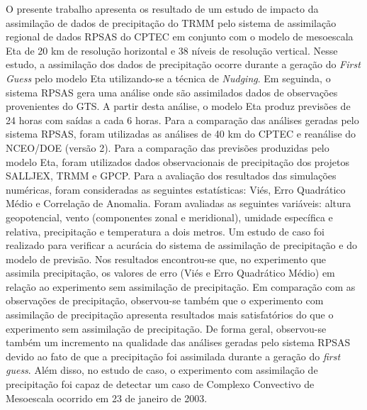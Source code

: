 \begin{resumo}
\hypertarget{estilo:abstract}{}

O presente trabalho apresenta os resultado de um estudo de impacto da assimilação de dados de precipitação do TRMM pelo sistema de assimilação regional de dados RPSAS do CPTEC em conjunto com o modelo de mesoescala Eta de 20 km de resolução horizontal e 38 níveis de resolução vertical. Nesse estudo, a assimilação dos dados de precipitação ocorre durante a geração do \textit{First Guess} pelo modelo Eta utilizando-se a técnica de \textit{Nudging}. Em seguinda, o sistema RPSAS gera uma análise onde são assimilados dados de observações provenientes do GTS. A partir desta análise, o modelo Eta produz previsões de 24 horas com saídas a cada 6 horas. Para a comparação das análises geradas pelo sistema RPSAS, foram utilizadas as análises de 40 km do CPTEC e reanálise do NCEO/DOE (versão 2). Para a comparação das previsões produzidas pelo modelo Eta, foram utilizados dados observacionais de precipitação dos projetos SALLJEX, TRMM e GPCP. Para a avaliação dos resultados das simulações numéricas, foram consideradas as seguintes estatísticas: Viés, Erro Quadrático Médio e Correlação de Anomalia. Foram avaliadas as seguintes variáveis: altura geopotencial, vento (componentes zonal e meridional), umidade específica e relativa, precipitação e temperatura a dois metros. Um estudo de caso foi realizado para verificar a acurácia do sistema de assimilação de precipitação e do modelo de previsão. Nos resultados encontrou-se que, no experimento que assimila precipitação, os valores de erro (Viés e Erro Quadrático Médio) em relação ao experimento sem assimilação de precipitação. Em comparação com as observações de precipitação, observou-se também que o experimento com assimilação de precipitação apresenta resultados mais satisfatórios do que o experimento sem assimilação de precipitação. De forma geral, observou-se também um incremento na qualidade das análises geradas pelo sistema RPSAS devido ao fato de que a precipitação foi assimilada durante a geração do \textit{first guess}. Além disso, no estudo de caso, o experimento com assimilação de precipitação foi capaz de detectar um caso de Complexo Convectivo de Mesoescala ocorrido em 23 de janeiro de 2003.

\end{resumo}
